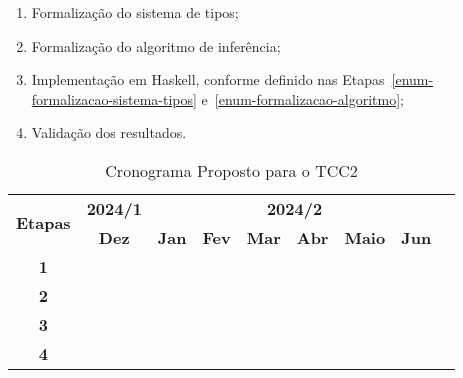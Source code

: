 \begin{enumerate}
	\item Formalização do sistema de tipos;\label{enum-formalizacao-sistema-tipos}
	\item Formalização do algoritmo de inferência;\label{enum-formalizacao-algoritmo}
	\item Implementação em Haskell, conforme definido nas Etapas~\ref{enum-formalizacao-sistema-tipos} e~\ref{enum-formalizacao-algoritmo};
	\item Validação dos resultados.
\end{enumerate}

\begin{table}[htbp]
	\centering
	\begin{tabular}{|c|c|c|c|c|c|c|c|c|}
		\hline
		\multirow{2}{*}{\textbf{\small{Etapas}}} & \textbf{\small{2024/1}} & \multicolumn{6}{c|}{\textbf{\small{2024/2}}} \\
		\cline{2-8}
		& \textbf{Dez} & \textbf{Jan} & \textbf{Fev} & \textbf{Mar} & \textbf{Abr} & \textbf{Maio} & \textbf{Jun} \\
		\hline
		\textbf{\small{1}}  & \cellcolor{gray} & \cellcolor{gray} & \cellcolor{gray} &  &  &  & \\
		\hline
		\textbf{\small{2}}  &  &  & \cellcolor{gray} & \cellcolor{gray} &  &  & \\
		\hline
		\textbf{\small{3}}  &  &  &  & \cellcolor{gray} & \cellcolor{gray} & \cellcolor{gray} & \\
		\hline
		\textbf{\small{4}}  &  &  &  &  &  & \cellcolor{gray} & \cellcolor{gray}\\
		\hline
	\end{tabular}
	\caption{Cronograma Proposto para o TCC2}
\end{table}
% 
% 
% 
